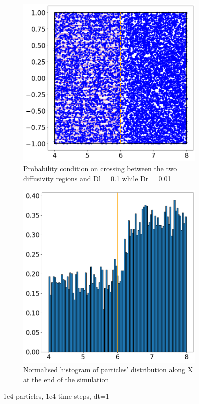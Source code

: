 \documentclass{article}
\begin{document}
\begin{figure}[htbp]
    \centering
    \begin{subfigure}[b]{0.45\textwidth}
        \centering
        \includegraphics[width=\textwidth]{images/positionsDl01Dr001RlPlRrPr.png}
        \caption{Probability condition on crossing between the two diffusivity regions and Dl = 0.1 while Dr = 0.01}
    \end{subfigure}
    \hfill
    \begin{subfigure}[b]{0.45\textwidth}
        \centering
        \includegraphics[width=\textwidth]{images/histDl01Dr001RlPlRrPr.png}
        \caption{Normalised histogram of particles' distribution along X at the end of the simulation}
    \end{subfigure}
    \caption{1e4 particles, 1e4 time steps, dt=1}
    \label{fig:MatrixDiffusion4}
\end{figure}
\end{document}
